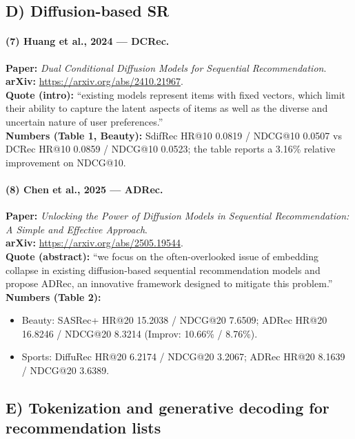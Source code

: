 \documentclass[11pt]{article}
\begin{document}
\subsection{D) Diffusion-based SR}
\paragraph{(7) Huang et al., 2024 --- DCRec.}
\textbf{Paper:} \emph{Dual Conditional Diffusion Models for Sequential Recommendation}.\\
\textbf{arXiv:} \url{https://arxiv.org/abs/2410.21967}.\\
\textbf{Quote (intro):} ``existing models represent items with fixed vectors, which limit their ability to capture the latent aspects of items as well as the diverse and uncertain nature of user preferences.''\\
\textbf{Numbers (Table 1, Beauty):} SdifRec HR@10 0.0819 / NDCG@10 0.0507 vs DCRec HR@10 0.0859 / NDCG@10 0.0523; the table reports a 3.16\% relative improvement on NDCG@10.

\paragraph{(8) Chen et al., 2025 --- ADRec.}
\textbf{Paper:} \emph{Unlocking the Power of Diffusion Models in Sequential Recommendation: A Simple and Effective Approach}.\\
\textbf{arXiv:} \url{https://arxiv.org/abs/2505.19544}.\\
\textbf{Quote (abstract):} ``we focus on the often-overlooked issue of embedding collapse in existing diffusion-based sequential recommendation models and propose ADRec, an innovative framework designed to mitigate this problem.''\\
\textbf{Numbers (Table 2):}
\begin{itemize}
  \item Beauty: SASRec+ HR@20 15.2038 / NDCG@20 7.6509; ADRec HR@20 16.8246 / NDCG@20 8.3214 (Improv: 10.66\% / 8.76\%).
  \item Sports: DiffuRec HR@20 6.2174 / NDCG@20 3.2067; ADRec HR@20 8.1639 / NDCG@20 3.6389.
\end{itemize}

\subsection{E) Tokenization and generative decoding for recommendation lists}
\end{document}
